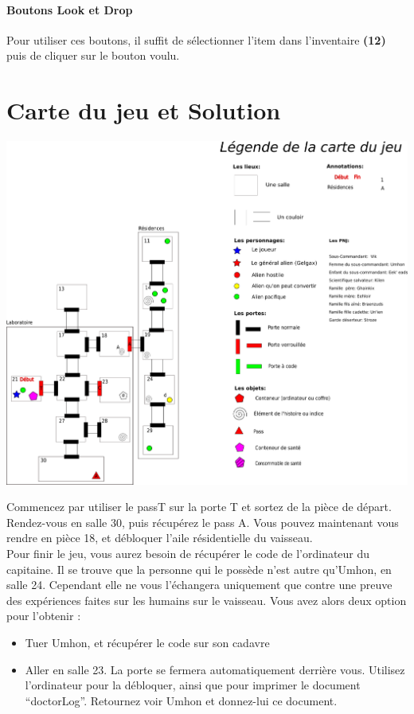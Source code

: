 \documentclass[./standalone.tex]{subfiles}
\begin{document}
\paragraph{Boutons Look et Drop\\}
    Pour utiliser ces boutons, il suffit de sélectionner l’item dans l’inventaire \textbf{(12)} puis de cliquer sur le bouton voulu.
\newpage
    
\section{Carte du jeu et Solution}
\begin{center}
	\includegraphics[scale=0.5]{images/v4.png}
\end{center}

Commencez par utiliser le passT sur la porte T et sortez de la pièce de départ. Rendez-vous en salle 30, puis récupérez le pass A. Vous pouvez maintenant vous rendre en pièce 18, et débloquer l’aile résidentielle du vaisseau.\\
 
Pour finir le jeu, vous aurez besoin de récupérer le code de l’ordinateur du capitaine. Il se trouve que la personne qui le possède n’est autre qu’Umhon, en salle 24. Cependant elle ne vous l’échangera uniquement que contre une preuve des expériences faites sur les humains sur le vaisseau. Vous avez alors deux option pour l’obtenir :
\begin{itemize}
	\item Tuer Umhon, et récupérer le code sur son cadavre
	\item Aller en salle 23. La porte se fermera automatiquement derrière vous. Utilisez l’ordinateur pour la débloquer, ainsi que pour imprimer le document “doctorLog”. Retournez voir Umhon et donnez-lui ce document.\\
\end{itemize}
\end{document}
